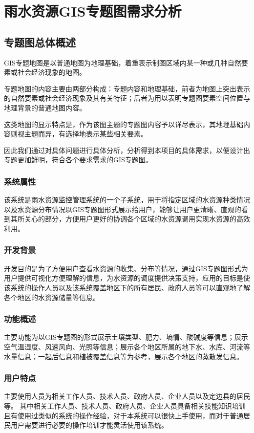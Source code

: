 \chapter{雨水资源GIS专题图需求分析}



\section{专题图总体概述}
GIS专题地图是以普通地图为地理基础，着重表示制图区域内某一种或几种自然要素或社会经济现象的地图。

专题地图的内容主要由两部分构成：专题内容和地理基础，前者为地图上突出表示的自然要素或社会经济现象及其有关特征；后者为用以表明专题图要素空间位置与地理背景的普通地图内容。

这类地图的显示特点是，作为该图主题的专题图内容予以详尽表示，其地理基础内容则视主题而异，有选择地表示某些相关要素。

因此我们通过对具体问题进行具体分析，分析得到本项目的具体需求，以便设计出专题更加鲜明，符合各个要求需求的GIS专题图。

\subsection{系统属性}
该系统是雨水资源监控管理系统的一个子系统，用于将指定区域的水资源种类情况以及水资源分布情况以GIS专题图形式展示给用户，能够让用户更清晰、直观的看到其所关心的部分，方便用户更好的协调各个区域的水资源调用实现水资源的高效利用。
\subsection{开发背景}
开发目的是为了方便用户查看水资源的收集、分布等情况，通过GIS专题图形式为用户提供可视化方便理解的信息，为水资源的调度提供决策支持，应用的目标是使该系统的操作人员以及该系统覆盖地区下的所有居民、政府人员等可以直观地了解各个地区的水资源储量等信息。
\subsection{功能概述}
主要功能为以GIS专题图的形式展示土壤类型、肥力、墒情、酸碱度等信息；展示空气温湿度、风速风向、光照等信息；展示各个地区所属的地下水、水库、河流等水量信息；一起后信息和植被覆盖信息等为参考，展示各个地区的蒸散发信息。
\subsection{用户特点}
主要使用人员为相关工作人员、技术人员、政府人员、企业人员以及定边县的居民等。
其中相关工作人员、技术人员、政府人员、企业人员具备相关技能知识培训且有使用过类似的系统的操作经验，对于本系统可以很快上手使用，而对于普通居民用户需要进行必要的操作培训才能灵活使用该系统。


